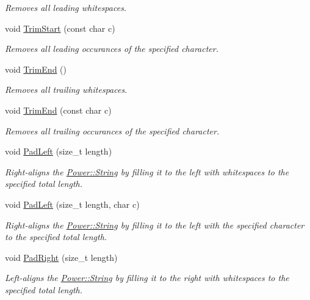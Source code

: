 \begin{DoxyCompactItemize}
\begin{DoxyCompactList}\small\item\em Removes all leading whitespaces. \end{DoxyCompactList}\item 
void \hyperlink{class_power_1_1_string_ae4130f9754a9f1f6a2570a13429cb3d0}{Trim\+Start} (const char c)
\begin{DoxyCompactList}\small\item\em Removes all leading occurances of the specified character. \end{DoxyCompactList}\item 
void \hyperlink{class_power_1_1_string_afd4d38398e47c0ab873e90431396663b}{Trim\+End} ()
\begin{DoxyCompactList}\small\item\em Removes all trailing whitespaces. \end{DoxyCompactList}\item 
void \hyperlink{class_power_1_1_string_aedaa5e01d3bc63c803e8c379477ba114}{Trim\+End} (const char c)
\begin{DoxyCompactList}\small\item\em Removes all trailing occurances of the specified character. \end{DoxyCompactList}\item 
void \hyperlink{class_power_1_1_string_a7f70e85bdbec97cc247d08ba74cb00ed}{Pad\+Left} (size\+\_\+t length)
\begin{DoxyCompactList}\small\item\em Right-\/aligns the \hyperlink{class_power_1_1_string}{Power\+::\+String} by filling it to the left with whitespaces to the specified total length. \end{DoxyCompactList}\item 
void \hyperlink{class_power_1_1_string_ae1a401f8fc597068ac70fc1f18dee45c}{Pad\+Left} (size\+\_\+t length, char c)
\begin{DoxyCompactList}\small\item\em Right-\/aligns the \hyperlink{class_power_1_1_string}{Power\+::\+String} by filling it to the left with the specified character to the specified total length. \end{DoxyCompactList}\item 
void \hyperlink{class_power_1_1_string_a48bd3019edb44ed96a6b69f3adf0d82d}{Pad\+Right} (size\+\_\+t length)
\begin{DoxyCompactList}\small\item\em Left-\/aligns the \hyperlink{class_power_1_1_string}{Power\+::\+String} by filling it to the right with whitespaces to the specified total length. \end{DoxyCompactList}\item 

\end{DoxyCompactItemize}
